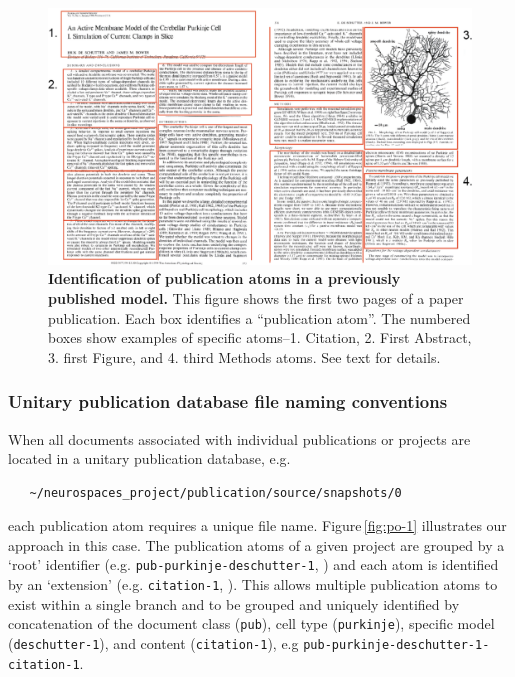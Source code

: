 \documentclass[12pt]{article}
\begin{document}
\begin{figure}[h]
  \centering
   \includegraphics[scale=0.3]{figures/pub-manual-atoms-3.eps}
\caption{{\bf Identification of publication atoms in a previously published model.} This figure shows the first two pages of a paper publication. Each {\color{Red}{\bf red}} box identifies a ``publication atom''. The numbered boxes show examples of specific atoms--1. Citation, 2. First Abstract, 3. first Figure, and 4. third Methods atoms. See text for details.}
  \label{fig:po-2}
\end{figure}

\subsubsection*{Unitary publication database file naming conventions}

When all documents associated with individual publications or projects are located in a unitary publication database, e.g. 
\begin{verbatim}
   ~/neurospaces_project/publication/source/snapshots/0
\end{verbatim}   
each publication atom requires a unique file name. Figure\,\ref{fig:po-1} illustrates our approach in this case. The publication atoms of a given project are grouped by a `root'  identifier (e.g. {\tt pub-purkinje-deschutter-1}, {\color{Red}{\bf red}}) and each atom is identified by an `extension' (e.g. {\tt citation-1}, {\color{Green}{\bf green}}). This allows multiple publication atoms to exist within a single branch and to be grouped and uniquely identified by concatenation of the document class ({\tt pub}), cell type ({\tt purkinje}), specific model ({\tt deschutter-1}), and content ({\tt citation-1}), e.g {\tt pub-purkinje-deschutter-1-citation-1}.
\end{document}
